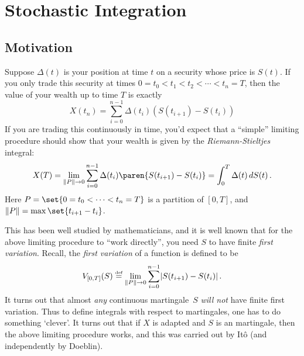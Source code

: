 
\ifstandalonechapter\setcounter{chapter}{2}\fi
\chapter{Stochastic Integration}\label{c:3int}

\section{Motivation}
Suppose $\Delta(t)$ is your position at time $t$ on a security whose price is $S(t)$.
If you only trade this security at times $0 = t_0 < t_1 < t_2 < \cdots < t_n = T$, then the value of your wealth up to time $T$ is exactly
\begin{equation*}
  X(t_n) = \sum_{i=0}^{n-1} \Delta(t_i) ( S(t_{i+1}) - S(t_i) )
\end{equation*}
If you are trading this continuously in time, you'd expect that a ``simple'' limiting procedure should show that your wealth is given by the \emph{Riemann-Stieltjes} integral:
\begin{equation*}%
  X(T) = 
    \lim_{\norm{P} \to 0}
      \sum_{i=0}^{n-1} \Delta(t_i) \paren{ S( t_{i+1} ) - S( t_i ) }
    = \int_0^T \Delta(t) \, dS(t) \,.
\end{equation*}
Here $P = \set{0 = t_0 < \cdots < t_n = T}$ is a partition of $[0, T]$, and $\norm{P} = \max\set{ t_{i+1} - t_i }$.


This has been well studied by mathematicians, and it is well known that for the above limiting procedure to ``work directly'', you need $S$ to have finite \emph{first variation}.
Recall, the \emph{first variation} of a function is defined to be
\begin{equation*}
  V_{[0,T]}(S) \stackrel{\scriptscriptstyle\textup{def}}{=} \lim_{\lVert P\rVert \to 0} \sum_{i=0}^{n-1} \lvert S(t_{i+1}) - S(t_i)\rvert\,.
\end{equation*}
It turns out that almost \emph{any} continuous martingale~$S$ \emph{will not} have finite first variation.
Thus to define integrals with respect to martingales, one has to do something `clever'.
It turns out that if $X$ is adapted and $S$ is an martingale, then the above limiting procedure works, and this was carried out by It\^o (and independently by Doeblin).

